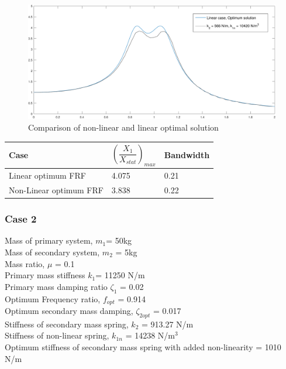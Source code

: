 \begin{figure}[h!]
\includegraphics[width=\textwidth, height = 0.5\textwidth]{"figures/2comparing"}
\caption{Comparison of non-linear and linear optimal solution}
\end{figure}

\begin{table}[h!]
\centering
\begin{tabular}{|m{6cm}|m{2cm}|m{2cm}|}
\hline
Case& $\left(\dfrac{X_{1}}{X_{stat}}\right)_{max}$ & Bandwidth \\
\hline
Linear optimum FRF & 4.075 & 0.21 

\\
\hline
Non-Linear optimum FRF & 3.838 & 0.22

 \\ 
\hline
\end{tabular}
\end{table}

\subsubsection{Case 2}
Mass of primary system, $m_1$= 50kg\\
Mass of secondary system, $m_2$ = 5kg\\
Mass ratio, $\mu$ = 0.1\\
Primary mass stiffness $k_1$= 11250 N/m\\
Primary mass damping ratio $\zeta_1$ = 0.02\\
Optimum Frequency ratio, $f_{opt}$ = 0.914\\
Optimum secondary mass damping, $\zeta_{2opt}$ = 0.017\\
Stiffness of secondary mass spring, $k_2$ = 913.27 N/m \\
Stiffness of non-linear spring, $k_{1n}$ = 14238 N/m$^3$\\
Optimum stiffness of secondary mass spring with added non-linearity = 1010 N/m

